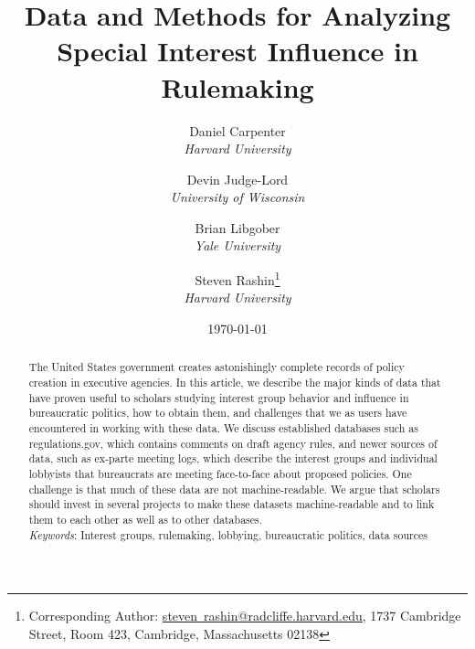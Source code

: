 \documentclass[
      12pt,
        ]{article}
\title{Data and Methods for Analyzing Special Interest Influence in Rulemaking}
\author{ %
            Daniel Carpenter  \\ \emph{Harvard University} 
             \and 
            Devin Judge-Lord  \\ \emph{University of Wisconsin} 
             \and 
            Brian Libgober  \\ \emph{Yale University} 
             \and 
            Steven Rashin\footnote{Corresponding Author:
\href{mailto:steven_rashin@radcliffe.harvard.edu}{steven~rashin@radcliffe.harvard.edu},
1737 Cambridge Street, Room 423, Cambridge, Massachusetts 02138}  \\ \emph{Harvard University} 
            }
\date{\today}
\begin{document}
 


  \maketitle




  \begin{abstract}
    \noindent The United States government creates astonishingly complete records of policy creation in executive agencies. In this article, we describe the major kinds of data that have proven useful to scholars studying interest group behavior and influence in bureaucratic politics, how to obtain them, and challenges that we as users have encountered in working with these data. We discuss established databases such as regulations.gov, which contains comments on draft agency rules, and newer sources of data, such as ex-parte meeting logs, which describe the interest groups and individual lobbyists that bureaucrats are meeting face-to-face about proposed policies. One challenge is that much of these data are not machine-readable. We argue that scholars should invest in several projects to make these datasets machine-readable and to link them to each other as well as to other databases.
          \hfill \\ 
      \noindent \emph{Keywords}: Interest groups, rulemaking, lobbying, bureaucratic politics, data
sources 
    
  \end{abstract}


  
\end{document}
